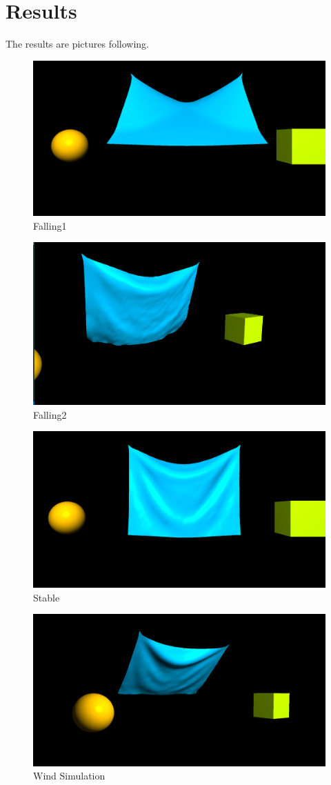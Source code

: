 \documentclass[acmtog]{acmart}
\begin{document}
\section{Results}
The results are pictures following.\\
\begin{figure}[h]
	\centering
	\includegraphics[width=0.7\linewidth]{Falling_1.png}
	\caption{Falling1}
	\label{fig:fall}
\end{figure}
\begin{figure}[h]
	\centering
	\includegraphics[width=0.7\linewidth]{Falling_2.png}
	\caption{Falling2}
	\label{fig:fall}
\end{figure}
\begin{figure}[h]
	\centering
	\includegraphics[width=0.7\linewidth]{Falling_stable.png}
	\caption{Stable}
	\label{fig:fall}
\end{figure}
\begin{figure}[h]
	\centering
	\includegraphics[width=0.7\linewidth]{Wind.png}
	\caption{Wind Simulation}
	\label{fig:wind}
\end{figure}
\end{document}
